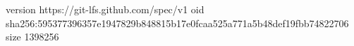 version https://git-lfs.github.com/spec/v1
oid sha256:595377396357e1947829b848815b17e0fcaa525a771a5b48def19fbb74822706
size 1398256
